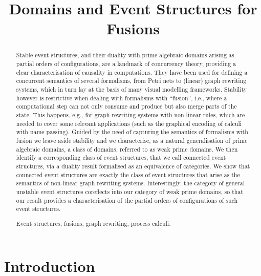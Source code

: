 \documentclass[conference]{IEEEtran}
\title{Domains and Event Structures for Fusions}
\author{\IEEEauthorblockN{Paolo Baldan}\IEEEauthorblockA{University of Padova}\IEEEauthorblockN{Andrea Corradini, Fabio Gadducci}\IEEEauthorblockA{University of Pisa}}
\begin{document}
\maketitle


\begin{abstract}
  Stable event structures, and their duality with prime algebraic domains
  arising as partial orders of configurations, are a landmark
  of concurrency theory, providing a clear characterisation of
  causality in computations.
  They have been used for defining a concurrent semantics of several
  formalisms, from Petri nets to (linear) graph rewriting systems,
  which in turn lay at the basis of many visual modelling frameworks.
  Stability however is restrictive when dealing with formalisms
  with ``fusion'', i.e., where a computational step can not only consume
  and produce but also merge parts of the state. This happens, e.g.,
  for graph rewriting systems with non-linear rules, which are needed
  to cover some relevant applications (such as the graphical encoding
  of calculi with name passing).
  Guided by the need of capturing the semantics of formalisms with
  fusion we leave aside stability and we characterise, as a natural
  generalisation of prime algebraic domains, a class of domains,
  referred to as weak prime domains.
  We then identify a corresponding class of event structures, that we call 
  connected event structures, via a duality result formalised as an equivalence
  of categories.
  We show that connected event structures are exactly the class of
  event structures that arise as the semantics of non-linear graph
  rewriting systems.
  Interestingly, the category of general unstable event structures
  coreflects into our category of {weak prime} domains, so that our
  result provides a characterisation of the partial orders of
  configurations of such event structures.

  \begin{IEEEkeywords}
    Event structures, fusions, graph rewriting, process calculi.
  \end{IEEEkeywords}
\end{abstract}



\section{Introduction}
\end{document}
